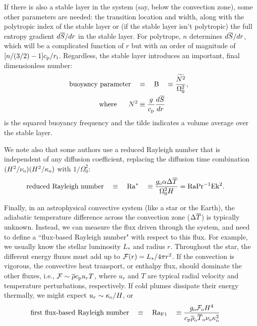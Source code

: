\documentclass[12pt]{article} %
\begin{document}
If there is also a stable layer in the system (say, below the convection zone), some other parameters are needed: the transition location and width, along with the polytropic index of the stable layer or (if the stable layer isn't polytropic) the full entropy gradient $d\overline{S}/dr$ in the stable layer. For polytrope, $n$ determines $d\overline{S}/dr$, which will be a complicated function of $r$ but with an order of magnitude of $[n/(3/2)-1]c_{\rm{p}}/r_{\rm{i}}$. Regardless, the stable layer introduces an important, final dimensionless number:
\begin{align}
	\text{buoyancy parameter}\quad & \equiv \quad {\rm{B}} \quad \equiv \frac{\widetilde{N^2}}{\Omega_0^2},\\
	\text{where}\ \ \ \ \  N^2 &\equiv \frac{g}{c_{\rm{p}}}\frac{d\overline{S}}{dr}
\end{align}
is the squared buoyancy frequency and the tilde indicates a volume average over the stable layer. 

We note also that some authors use a reduced Rayleigh number that is independent of any diffusion coefficient, replacing the diffusion time combination $(H^2/\nu_{\rm{o}})(H^2/\kappa_{\rm{o}})$ with $1/\Omega_0^2$:
\begin{align}
		\text{reduced Rayleigh number} \quad & \equiv \quad {\rm{Ra^*}} \quad \equiv \frac{g_{\rm{o}}\alpha\Delta\overline{T} }{\Omega_0^2H}=\rm{Ra Pr^{-1} Ek^2}.
\end{align}

Finally, in an astrophysical convective system (like a star or the Earth), the adiabatic temperature difference across the convection zone ($\Delta\overline{T}$) is typically unknown. Instead, we can measure the flux driven through the system, and need to define a ``flux-based Rayleigh number" with respect to this flux. For example, we usually know the stellar luminosity $L_*$ and radius $r$. Throughout the star, the different energy fluxes must add up to ${\mathcal{F}}(r)=L_*/4\pi r^2$. If the convection is vigorous, the convective heat transport, or enthalpy flux, should dominate the other fluxes, i.e., ${\mathcal{F}}\sim\overline{\rho}c_{\rm{p}} u_rT$, where $u_r$ and $T$ are typical radial velocity and temperature perturbations, respectively. If cold plumes dissipate their energy thermally, we might expect $u_r\sim\kappa_{\rm{o}}/H$, or 
\begin{align}
	\text{first flux-based Rayleigh number} \quad & \equiv \quad {\rm{Ra_{F1}}} \quad \equiv \frac{g_{\rm{o}}{\mathcal{F}}_{\rm{o}} H^4}{c_{\rm{p}}\overline{\rho}_{\rm{o}}\overline{T}_{\rm{o}}\nu_{\rm{o}}\kappa_{\rm{o}}^2}
\end{align}
\end{document}
